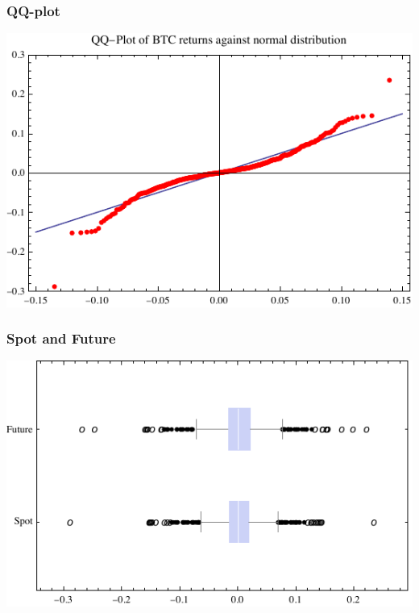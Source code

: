 \documentclass[10pt,mathserif,notes=show]{beamer}
\renewcommand{\(}{\begin{columns}}
\renewcommand{\)}{\end{columns}}
\newcommand{\<}[1]{\begin{column}{#1}}
\renewcommand{\>}{\end{column}}
\theoremstyle{definition}
\begin{document}
\begin{frame}
  \frametitle{QQ-plot}
  \begin{center}
    \includegraphics[scale=1]{../_pics/btc_qq.pdf}
  \end{center}
\end{frame}

\begin{frame}
  \frametitle{Spot and Future}
  \begin{center}
    \includegraphics[scale=1]{../_pics/btc_future_box.pdf}
  \end{center}
\end{frame}
\end{document}
